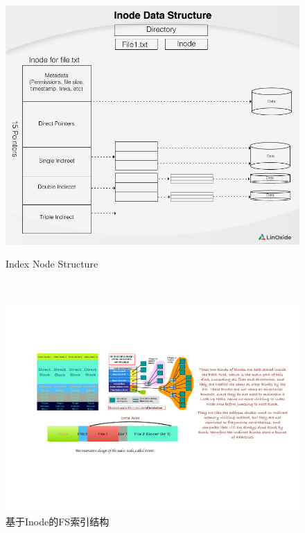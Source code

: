 \documentclass[]{report}
\begin{document}
		\begin{figure}[h]
			\centering
			\begin{minipage}{40em}
				\centering
				\includegraphics[scale = 0.3]{images/inode-data-structure.png}
				\caption{Index Node Structure}
			\end{minipage}
			\\[5pt]
			\begin{minipage}{40em}
				\centering
				\includegraphics[scale = 0.57]{images/Inode_Structure.pdf}
				\caption{基于Inode的FS索引结构}
			\end{minipage}
		\end{figure}
\end{document}

